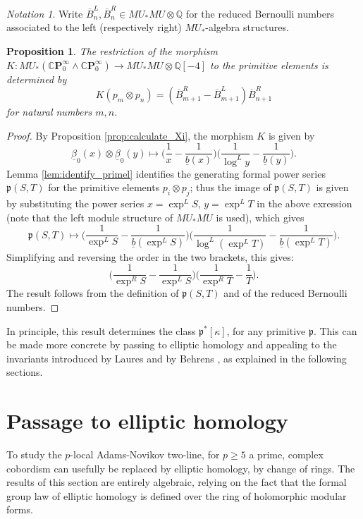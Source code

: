 \documentclass[10pt,a4paper]{amsart}
\newtheorem{prop}[thm]{Proposition}
\theoremstyle{definition}
\theoremstyle{remark}
\newtheorem{nota}[thm]{Notation}
\newcommand{\divBern}{\overline{B}}
\newcommand{\primel}{\mathfrak{p}}
\newcommand{\rat}{\mathbb{Q}}
\newcommand{\cp}{\mathbb{C} \mathbf{P}^\infty}
\renewcommand{\smash}{\wedge}
\begin{document}
\begin{nota}
	Write $\divBern_n ^L, \divBern_n^R \in MU_*MU \otimes \rat$ for the reduced Bernoulli numbers  associated to the left (respectively right) $MU_*$-algebra structures.
\end{nota}


\begin{prop}
 \label{prop:restrict_Xi_prim}
The restriction of the morphism $K : MU_* (\cp_0 \smash \cp_0) \rightarrow MU_*MU\otimes \rat [-4]$ to the primitive elements is determined
by
\[
 K (p_m \otimes p_n)
=
 (\divBern^R_{m+1} - \divBern^L _{m+1})\divBern^R_{n+1}
\]
for natural numbers $m,n$.
\end{prop}

\begin{proof}
By Proposition \ref{prop:calculate_Xi}, the morphism $K $ is given by
\[
 \underline{\beta}_0 (x) \otimes \underline{\beta}_0 (y)
\mapsto
\Big(
\frac{1}{x}- \frac{1}{\underline{b}(x)}
\Big)
\Big(
\frac{1}{\log^L y }
- \frac{1}{\underline{b}(y)}
\Big).
\]
 Lemma \ref{lem:identify_primel} identifies the generating formal power series  $\primel(S,T)$ for the primitive elements $p_i \otimes p_j$; thus the image of $\primel(S,T)$ is given by substituting the power series $x= \exp^L
S $, $y=\exp^L T$ in the above exression (note that  the left module structure of $MU_*MU$ is used), which gives
\[
\primel(S,T)
\mapsto
\Big(
\frac{1}{\exp^L S}- \frac{1}{\underline{b}(\exp^L S)}
\Big)
\Big(
\frac{1}{\log^L ( \exp^L T)}
- \frac{1}{\underline{b}(\exp^L T)}
\Big).
\]
Simplifying and reversing the order in the two brackets, this gives:
\[
\Big(
\frac{1}{\exp^R S}- \frac{1}{\exp^L S}
\Big)
\Big(
\frac{1}{\exp^R T}
-
\frac{1}{T}
\Big).
\]
The result follows from the definition of $\primel(S,T)$ and  of the reduced Bernoulli numbers.
\end{proof}



	In principle, this result determines the class $\primel ^* [\kappa]$, for any primitive $\primel$. This can be made more concrete by passing to elliptic homology and appealing to the invariants introduced by Laures \cite{laures} and by Behrens \cite{behrens}, as explained in the following sections.

 
%
\section{Passage to elliptic homology}

To study the $p$-local Adams-Novikov two-line, for $p \geq 5$ a prime, complex cobordism can usefully be replaced by elliptic homology, by change of rings.
 The results of this section are entirely algebraic, relying on the fact that the formal group law of elliptic homology is defined over the ring of holomorphic modular forms.
\end{document}
